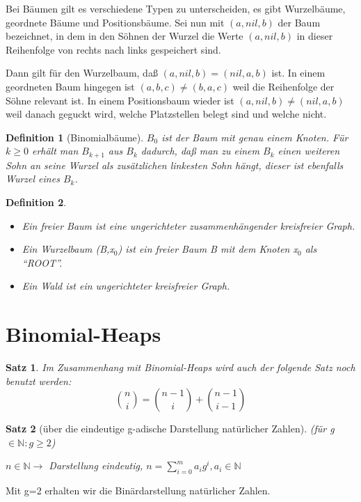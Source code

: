 \documentclass[ngerman,draft,parskip=half*,twoside]{scrreprt}
\theoremstyle{break}
\newtheorem{satz}{Satz}[chapter]
\newtheorem{definition}{Definition}[chapter]
\theoremstyle{nonumberbreak}
\newcommand*{\N}{\mathbb{N}}        %
\begin{document}
Bei Bäumen gilt es verschiedene Typen zu unterscheiden, es gibt Wurzelbäume, geordnete Bäume und Positionsbäume.
Sei nun mit $(a,nil,b)$ der Baum bezeichnet, in dem in den Söhnen der Wurzel die Werte $(a,nil,b)$ in dieser Reihenfolge von rechts nach
links gespeichert sind.

Dann gilt für den Wurzelbaum, daß $(a,nil,b)=(nil,a,b)$ ist. In einem
geordneten Baum hingegen ist $(a,b,c)\neq(b,a,c)$ weil die
Reihenfolge der Söhne relevant ist. In einem Positionsbaum wieder ist
$(a,nil,b)\neq(nil,a,b)$ weil danach geguckt wird, welche
Platzstellen belegt sind und welche nicht.

\begin{definition}[Binomialbäume]
  $B_0$ ist der Baum mit genau einem Knoten. Für $k\geq0$ erhält man
  $B_{k+1}$ aus $B_k$ dadurch, daß man zu einem $B_k$ einen weiteren
  Sohn an seine Wurzel als zusätzlichen linkesten Sohn hängt, dieser
  ist ebenfalls Wurzel eines $B_k$.
\end{definition}

\begin{definition}
\begin{itemize}
\item Ein freier Baum ist eine ungerichteter zusammenhängender kreisfreier Graph.
\item Ein Wurzelbaum (B,x$_0$) ist ein freier Baum B mit dem Knoten x$_0$ als "`ROOT"'.
\item Ein Wald ist ein ungerichteter kreisfreier Graph. 
\end{itemize}
\end{definition}

\section{Binomial-Heaps}  
\begin{satz}
Im Zusammenhang mit Binomial-Heaps wird auch der folgende Satz noch benutzt werden:
\[\binom{n}{i}=\binom{n-1}{i}+\binom{n-1}{i-1}\]
\end{satz}

\begin{satz}[über die eindeutige g-adische Darstellung natürlicher Zahlen]
(für g $\in \N : g\geq 2$)

$n \in \N \rightarrow$ Darstellung eindeutig, $n=\sum_{i=0}^m a_i g^i, a_i \in \N$
\end{satz}
Mit g=2 erhalten wir die Binärdarstellung natürlicher Zahlen.
\end{document}
